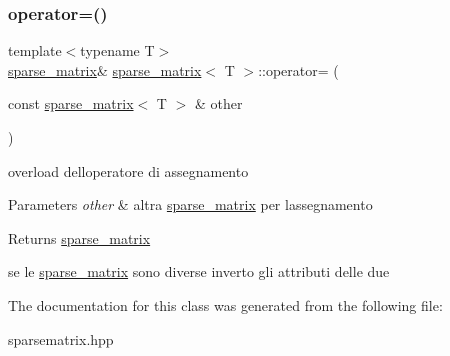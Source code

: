 \subsubsection{\texorpdfstring{operator=()}{operator=()}}
{\footnotesize\ttfamily template$<$typename T$>$ \\
\hyperlink{classsparse__matrix}{sparse\+\_\+matrix}\& \hyperlink{classsparse__matrix}{sparse\+\_\+matrix}$<$ T $>$\+::operator= (\begin{DoxyParamCaption}\item[{const \hyperlink{classsparse__matrix}{sparse\+\_\+matrix}$<$ T $>$ \&}]{other }\end{DoxyParamCaption})\hspace{0.3cm}{\ttfamily [inline]}}



overload dell\textquotesingle{}operatore di assegnamento 


\begin{DoxyParams}{Parameters}
{\em other} & altra \hyperlink{classsparse__matrix}{sparse\+\_\+matrix} per l\textquotesingle{}assegnamento \\
\hline
\end{DoxyParams}
\begin{DoxyReturn}{Returns}
\hyperlink{classsparse__matrix}{sparse\+\_\+matrix} 
\end{DoxyReturn}
se le \hyperlink{classsparse__matrix}{sparse\+\_\+matrix} sono diverse inverto gli attributi delle due

The documentation for this class was generated from the following file\+:\begin{DoxyCompactItemize}
\item 
sparsematrix.\+hpp\end{DoxyCompactItemize}
